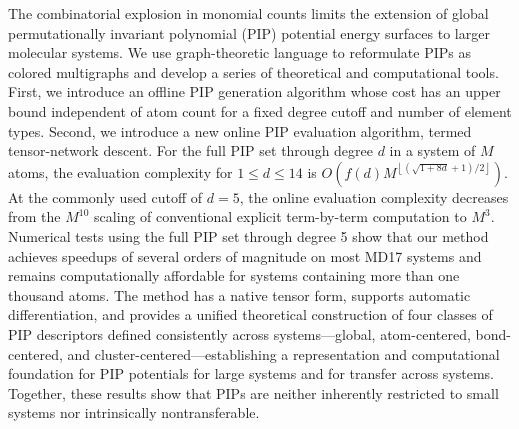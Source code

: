 The combinatorial explosion in monomial counts limits the extension of global permutationally invariant polynomial (PIP) potential energy surfaces to larger molecular systems. We use graph-theoretic language to reformulate PIPs as colored multigraphs and develop a series of theoretical and computational tools.
First, we introduce an offline PIP generation algorithm whose cost has an upper bound independent of atom count for a fixed degree cutoff and number of element types.
Second, we introduce a new online PIP evaluation algorithm, termed tensor-network descent.
For the full PIP set through degree \(d\) in a system of \(M\) atoms, the evaluation complexity for \(1\le d\le14\) is \(O\!\left(f(d)M^{\left\lfloor(\sqrt{1+8d}+1)/2\right\rfloor}\right)\).
At the commonly used cutoff of \(d=5\), the online evaluation complexity decreases from the \(M^{10}\) scaling of conventional explicit term-by-term computation to \(M^3\).
Numerical tests using the full PIP set through degree 5 show that our method achieves speedups of several orders of magnitude on most MD17 systems and remains computationally affordable for systems containing more than one thousand atoms.
The method has a native tensor form, supports automatic differentiation, and provides a unified theoretical construction of four classes of PIP descriptors defined consistently across systems---global, atom-centered, bond-centered, and cluster-centered---establishing a representation and computational foundation for PIP potentials for large systems and for transfer across systems.
Together, these results show that PIPs are neither inherently restricted to small systems nor intrinsically nontransferable.
